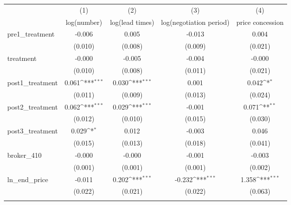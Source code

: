 {
\def\sym#1{\ifmmode^{#1}\else\(^{#1}\)\fi}
\begin{tabular}{l*{4}{c}}
\toprule
            &\multicolumn{1}{c}{(1)}&\multicolumn{1}{c}{(2)}&\multicolumn{1}{c}{(3)}&\multicolumn{1}{c}{(4)}\\
            &\multicolumn{1}{c}{log(number)}&\multicolumn{1}{c}{log(lead times)}&\multicolumn{1}{c}{log(negotiation period)}&\multicolumn{1}{c}{price concession}\\
\midrule
pre1\_treatment&      -0.006         &       0.005         &      -0.013         &       0.004         \\
            &     (0.010)         &     (0.008)         &     (0.009)         &     (0.021)         \\
\addlinespace
treatment   &      -0.000         &      -0.005         &      -0.004         &      -0.000         \\
            &     (0.010)         &     (0.008)         &     (0.011)         &     (0.021)         \\
\addlinespace
post1\_treatment&       0.061\sym{***}&       0.030\sym{***}&       0.001         &       0.042\sym{*}  \\
            &     (0.011)         &     (0.009)         &     (0.013)         &     (0.024)         \\
\addlinespace
post2\_treatment&       0.062\sym{***}&       0.029\sym{***}&      -0.001         &       0.071\sym{**} \\
            &     (0.012)         &     (0.010)         &     (0.015)         &     (0.030)         \\
\addlinespace
post3\_treatment&       0.029\sym{*}  &       0.012         &      -0.003         &       0.046         \\
            &     (0.015)         &     (0.013)         &     (0.018)         &     (0.041)         \\
\addlinespace
broker\_410  &      -0.000         &      -0.000         &      -0.001         &      -0.003         \\
            &     (0.001)         &     (0.001)         &     (0.001)         &     (0.002)         \\
\addlinespace
ln\_end\_price&      -0.011         &       0.202\sym{***}&      -0.232\sym{***}&       1.358\sym{***}\\
            &     (0.022)         &     (0.021)         &     (0.022)         &     (0.063)         \\
\addlinespace

\end{tabular}}
